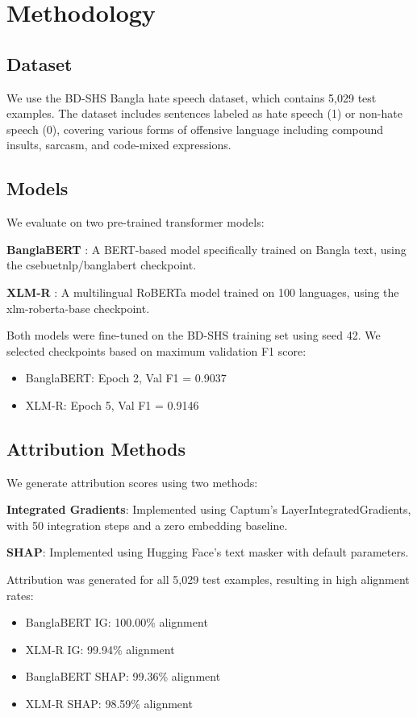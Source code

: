 \documentclass[journal]{IEEEtran}
\begin{document}
\section{Methodology}

\subsection{Dataset}

We use the BD-SHS \cite{BDSHS} Bangla hate speech dataset, which contains 5,029 test examples. The dataset includes sentences labeled as hate speech (1) or non-hate speech (0), covering various forms of offensive language including compound insults, sarcasm, and code-mixed expressions.

\subsection{Models}

We evaluate on two pre-trained transformer models:

\textbf{BanglaBERT} \cite{BanglaBERT}: A BERT-based model specifically trained on Bangla text, using the csebuetnlp/banglabert checkpoint.

\textbf{XLM-R} \cite{XLMR}: A multilingual RoBERTa model trained on 100 languages, using the xlm-roberta-base checkpoint.

Both models were fine-tuned on the BD-SHS training set using seed 42. We selected checkpoints based on maximum validation F1 score:
\begin{itemize}
    \item BanglaBERT: Epoch 2, Val F1 = 0.9037
    \item XLM-R: Epoch 5, Val F1 = 0.9146
\end{itemize}

\subsection{Attribution Methods}

We generate attribution scores using two methods:

\textbf{Integrated Gradients}: Implemented using Captum's LayerIntegratedGradients, with 50 integration steps and a zero embedding baseline.

\textbf{SHAP}: Implemented using Hugging Face's text masker with default parameters.

Attribution was generated for all 5,029 test examples, resulting in high alignment rates:
\begin{itemize}
    \item BanglaBERT IG: 100.00\% alignment
    \item XLM-R IG: 99.94\% alignment
    \item BanglaBERT SHAP: 99.36\% alignment
    \item XLM-R SHAP: 98.59\% alignment
\end{itemize}
\end{document}
